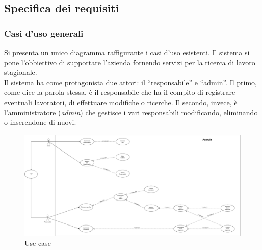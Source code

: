 \documentclass[a4paper,11pt]{article}
\begin{document}
\newpage


\subsection{Specifica dei requisiti}
\subsubsection{Casi d'uso generali}
Si presenta un unico diagramma raffigurante i casi d'uso esistenti. Il sistema si pone l'obbiettivo di supportare l'azienda fornendo servizi per la ricerca di lavoro stagionale.\\
Il sistema ha come protagonista due attori: il ``responsabile'' e ``admin''. Il primo, come dice la parola stessa, è il responsabile che ha il compito di registrare eventuali lavoratori, di effettuare modifiche o ricerche. Il secondo, invece, è l'amministratore (\emph{admin}) che gestisce i vari responsabili modificando, eliminando o inserendone di nuovi.
\begin{figure}[htpb]
	\centering
	\includegraphics[width=1\textwidth]{diagrams/Use_case.pdf}
	\caption{Use case}
	\label{fig:use_case}
\end{figure}
\end{document}
